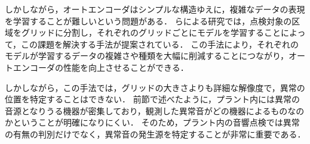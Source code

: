 \documentclass[../main]{subfiles}
\begin{document}
しかしながら，オートエンコーダはシンプルな構造ゆえに，複雑なデータの表現を学習することが難しいという問題がある．
らによる研究では，点検対象の区域をグリッドに分割し，それぞれのグリッドごとにモデルを学習することによって，この課題を解決する手法が提案されている．
この手法により，それぞれのモデルが学習するデータの複雑さや種類を大幅に削減することにつながり，オートエンコーダの性能を向上させることができる．

しかしながら，この手法では，グリッドの大きさよりも詳細な解像度で，異常の位置を特定することはできない．
前節で述べたように，プラント内には異常の音源となりうる機器が密集しており，観測した異常音がどの機器によるものなのかということが明確になりにくい．
そのため，プラント内の音響点検では異常の有無の判別だけでなく，異常音の発生源を特定することが非常に重要である．
\end{document}
